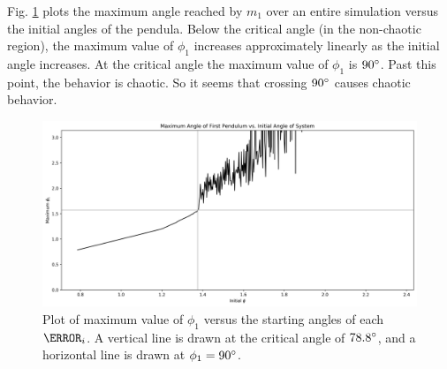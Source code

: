 \documentclass{article}
\begin{document}
Fig. \ref{fig:max_angle} plots the maximum angle reached by $m_1$ over an
entire simulation versus the initial angles of the pendula. Below the
critical angle (in the non-chaotic region), the maximum value of $\phi_1$
increases approximately linearly as the initial angle increases. At the
critical angle the maximum value of $\phi_1$ is $90\degree$. Past this
point, the behavior is chaotic. So it seems that crossing $90\degree$ 
causes chaotic behavior.

\begin{figure}[ht]
    \centering
    \includegraphics[width=\textwidth]{max_angle_critical}
    \caption{Plot of maximum value of $\phi_1$ versus the starting angles
    of each $\m_i$. A vertical line is drawn at the critical angle of 
    $78.8\degree$, and a horizontal line is drawn at $\phi_1=90\degree$.}
    \label{fig:max_angle}
\end{figure}
\end{document}

